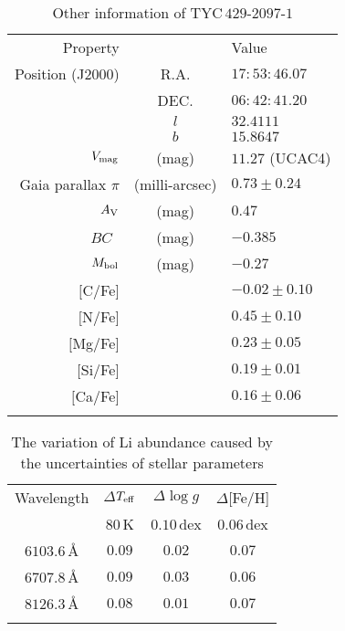 \documentclass[twoside,onecolumnm,12pt]{article}
\newcommand{\Teff}{$T_{\rm eff}$}
\begin{document}
\begin{table}[!h]
\begin{center}
\caption{Other information of TYC\,$429$-$2097$-$1$}\label{s_tab1}
\begin{tabular}{rcl}
\hline\hline\noalign{\smallskip}
 Property & & Value\\
\noalign{\smallskip}
\hline\noalign{\smallskip}
 Position (J2000)          & R.A.           & $17:53:46.07$   \\
                           & DEC.           & $06:42:41.20$   \\
                           & $l$            & $32.4111$       \\
                           & $b$            & $15.8647$       \\
 \noalign{\smallskip}
 \hline
 \noalign{\smallskip}
 $V_{\rm mag}$             & (mag)          & $11.27$ (UCAC4) \\
 Gaia parallax $\pi$       & (milli-arcsec) & $0.73\pm0.24$   \\
 $A_{\rm V}$               & (mag)          & $0.47$          \\
 $BC$\                     & (mag)          & $-0.385$        \\
 $M_{\rm bol}$             & (mag)          & $-0.27$         \\
 \noalign{\smallskip}
 \hline
 \noalign{\smallskip}
 $[$C/Fe$]$                &                & $-0.02\pm0.10$  \\
 $[$N/Fe$]$                &                & $ 0.45\pm0.10$  \\
 $[$Mg/Fe$]$               &                & $ 0.23\pm0.05$  \\
 $[$Si/Fe$]$               &                & $ 0.19\pm0.01$  \\
 $[$Ca/Fe$]$               &                & $ 0.16\pm0.06$  \\
 \noalign{\smallskip} \hline
 \end{tabular}
 \end{center}
 \end{table}
 

\begin{table}[!h]
\begin{center}
\caption{The variation of Li abundance caused by the uncertainties of stellar parameters }\label{s_tab2}
\begin{tabular}{cccc}
\hline\hline\noalign{\smallskip}
 Wavelength & $\Delta$\Teff & $\Delta \log g$ & $\Delta$[Fe/H] \\
\noalign{\smallskip}
            & $80$\,K       & $0.10$\,dex   & $0.06$\,dex    \\
\noalign{\smallskip}
\hline\noalign{\smallskip}
 $6103.6$\,\AA  & $0.09$ & $0.02$ & $0.07$ \\
 $6707.8$\,\AA  & $0.09$ & $0.03$ & $0.06$ \\
 $8126.3$\,\AA  & $0.08$ & $0.01$ & $0.07$ \\
 \noalign{\smallskip} \hline
 \end{tabular}
 \end{center}
 \end{table}
\end{document}
